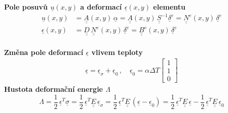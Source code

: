 \documentclass[10pt,oneside]{article}
\newcommand{\ul}[1]{\underline{#1}}
\newcommand{\ull}[1]{\underline{\underline{#1}}}
\begin{document}
%
\textbf{Pole posuvů $\ul{u}(x,y)$ a deformací $\ul{\epsilon}(x,y)$ elementu}
%
\begin{align*}
	\ul{u}(x,y) &= \ull{A}(x,y)\,\ul{\alpha} = \ull{A}(x,y)\,\ull{S}^{-1} \ul{\delta}^e = \ull{N}^e(x,y)\,\ul{\delta}^e\\
	\ul{\epsilon}(x,y) &= \ull{D}\,\ull{N}^e(x,y)\,\ul{\delta}^e = \ull{B}^e(x,y)\,\ul{\delta}^e \\
\end{align*}
%

\textbf{Změna pole deformací $\ul{\epsilon}$ vlivem teploty}
%
\begin{align*}
	\ul{\epsilon} = \ul{\epsilon}_\sigma + \ul{\epsilon}_0 \,,\quad \ul{\epsilon}_0 = \alpha \Delta T \begin{bmatrix}1\\1\\0\end{bmatrix}
\end{align*}
%
\textbf{Hustota deformační energie $\Lambda$}
\begin{equation*}
	\Lambda = \frac{1}{2}\,\ul{\epsilon}^T \ul{\sigma}
		= \frac{1}{2}\,\ul{\epsilon}^T \ull{E}\,\ul{\epsilon}_\sigma
		= \frac{1}{2}\,\ul{\epsilon}^T \ull{E}\,(\ul{\epsilon} - \ul{\epsilon}_0)
		= \frac{1}{2}\,\ul{\epsilon}^T \ull{E}\,\ul{\epsilon} - \frac{1}{2}\,\ul{\epsilon}^T \ull{E}\,\ul{\epsilon}_0
\end{equation*}
\end{document}
